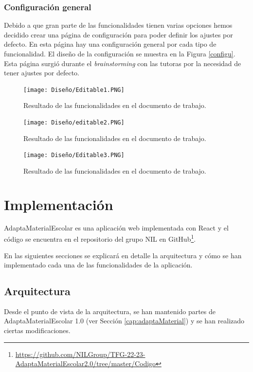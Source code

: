 \subsubsection{Configuración general}
Debido a que gran parte de las funcionalidades tienen varias opciones hemos decidido crear una página de configuración para poder definir los ajustes por defecto. En esta página hay una configuración general por cada tipo de funcionalidad. El diseño de la configuración se muestra en la Figura \ref{configu}. Esta página surgió durante el \textit{brainstorming} con las tutoras por la necesidad de tener ajustes por defecto.



\begin{figure}[ht!]
  \centering
  \texttt{[image: Diseño/Editable1.PNG]}
  \caption{Resultado de las funcionalidades en el documento de trabajo.}
  \label{editable1}
\end{figure}

\begin{figure}[ht!]
  \centering
  \texttt{[image: Diseño/editable2.PNG]}
  \caption{Resultado de las funcionalidades en el documento de trabajo.}
  \label{editable2}
\end{figure}

\begin{figure}[ht!]
  \centering
  \texttt{[image: Diseño/Editable3.PNG]}
  \caption{Resultado de las funcionalidades en el documento de trabajo.}
  \label{editable3}
\end{figure}

\section{Implementación}
\label{sec:implmentaction}
AdaptaMaterialEscolar es una aplicación web implementada con React y el código se encuentra en el repositorio del grupo NIL en GitHub\footnote{\url{https://github.com/NILGroup/TFG-22-23-AdaptaMaterialEscolar2.0/tree/master/Codigo}}.

En las siguientes secciones se explicará en detalle la arquitectura y cómo se han implementado cada una de las funcionalidades de la aplicación.
\subsection{Arquitectura}
\label{sub:Arquitectura}
Desde el punto de vista de la arquitectura, se han mantenido partes de AdaptaMaterialEscolar 1.0 (ver Sección \ref{cap:adaptaMaterial}) y se han realizado ciertas modificaciones.

